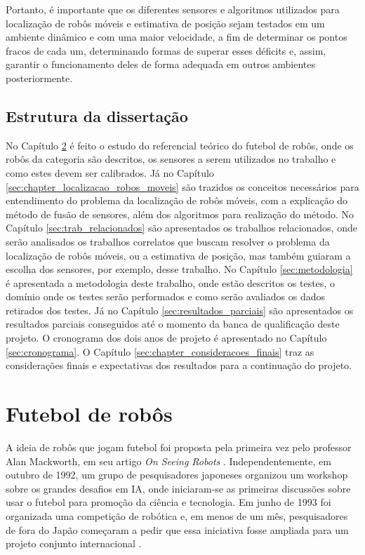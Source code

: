 \documentclass[acronym, symbols, table]{fei}
\begin{document}
		Portanto, é importante que os diferentes sensores e algoritmos utilizados para localização de robôs móveis e estimativa de posição sejam testados em um ambiente dinâmico e com uma maior velocidade, a fim de determinar os pontos fracos de cada um, determinando formas de superar esses déficits e, assim, garantir o funcionamento deles de forma adequada em outros ambientes posteriormente.
	
	\section{Estrutura da dissertação}
	
		No Capítulo \ref{sec:chapter_futebol_robos} é feito o estudo do referencial teórico do futebol de robôs, onde os robôs da categoria  são descritos, os sensores a serem utilizados no trabalho e como estes devem ser calibrados. Já no Capítulo \ref{sec:chapter_localizacao_robos_moveis} são trazidos os conceitos necessários para entendimento do problema da localização de robôs móveis, com a explicação do método de fusão de sensores, além dos algoritmos para realização do método. No Capítulo \ref{sec:trab_relacionados} são apresentados os trabalhos relacionados, onde serão analisados os trabalhos correlatos que buscam resolver o problema da localização de robôs móveis, ou a estimativa de posição, mas também guiaram a escolha dos sensores, por exemplo, desse trabalho. No Capítulo \ref{sec:metodologia} é apresentada a metodologia deste trabalho, onde estão descritos os testes, o domínio onde os testes serão performados e como serão avaliados os dados retirados dos testes. Já no Capítulo \ref{sec:resultados_parciais} são apresentados os resultados parciais conseguidos até o momento da banca de qualificação deste projeto. O cronograma dos dois anos de projeto é apresentado no Capítulo \ref{sec:cronograma}. O Capítulo \ref{sec:chapter_consideracoes_finais} traz as considerações finais e expectativas dos resultados para a continuação do projeto.

	\chapter{Futebol de robôs}\label{sec:chapter_futebol_robos}
	
		A ideia de robôs que jogam futebol foi proposta pela primeira vez pelo professor Alan Mackworth, em seu artigo \textit{On Seeing Robots} \cite{OnSeeingRobots}. Independentemente, em outubro de 1992, um grupo de pesquisadores japoneses organizou um workshop sobre os grandes desafios em IA, onde iniciaram-se as primeiras discussões sobre usar o futebol para promoção da ciência e tecnologia. Em junho de 1993 foi organizada uma competição de robótica e, em menos de um mês, pesquisadores de fora do Japão começaram a pedir que essa iniciativa fosse ampliada para um projeto conjunto internacional \cite{RoboCup}.
		
\end{document}
